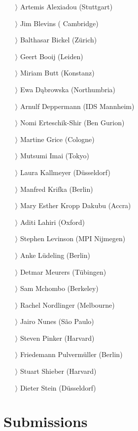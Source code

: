 \documentclass[
notumble,
]{leaflet}
\begin{document}
\begin{itemize}
 \item[$\rangle$] Artemis Alexiadou (Stuttgart)
 \item[$\rangle$] Jim Blevins ( Cambridge)
 \item[$\rangle$] Balthasar Bickel (Z\"urich)
 \item[$\rangle$] Geert Booij (Leiden)
 \item[$\rangle$] Miriam Butt (Konstanz)
 \item[$\rangle$] Ewa D\k{a}browska (Northumbria)
 \item[$\rangle$] Arnulf Deppermann (IDS Mannheim)
 \item[$\rangle$] Nomi Erteschik-Shir (Ben Gurion)
 \item[$\rangle$] Martine Grice (Cologne)
 \item[$\rangle$] Mutsumi Imai (Tokyo)
 \item[$\rangle$] Laura Kallmeyer (D\"usseldorf)
 \item[$\rangle$] Manfred Krifka (Berlin)
 \item[$\rangle$] Mary Esther Kropp Dakubu (Accra)
 \item[$\rangle$] Aditi Lahiri (Oxford)
 \item[$\rangle$] Stephen Levinson (MPI Nijmegen)
 \item[$\rangle$] Anke L\"udeling (Berlin)
 \item[$\rangle$] Detmar Meurers (T\"ubingen)
 \item[$\rangle$] Sam Mchombo (Berkeley)
 \item[$\rangle$] Rachel Nordlinger (Melbourne)
 \item[$\rangle$] Jairo Nunes (S\~ao Paulo)
 \item[$\rangle$] Steven Pinker (Harvard)
 \item[$\rangle$] Friedemann Pulverm\"uller (Berlin)
 \item[$\rangle$] Stuart Shieber (Harvard)
 \item[$\rangle$] Dieter Stein (D\"usseldorf)  
\end{itemize}

    
    
     
   
   
\newpage 
\section{\sffamily\Large Submissions}
\end{document}

